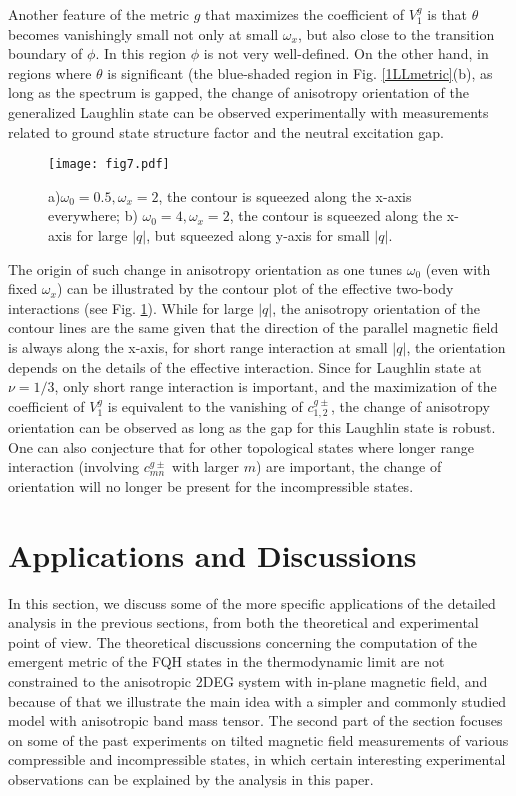 \documentclass[twocolumn,showpacs,amsmath,amstex,amssymb,mathfonts,prb]{revtex4-1}
\begin{document}
Another feature of the metric $g$ that maximizes the coefficient of $V_1^g$ is that $\theta$ becomes vanishingly small not only at small $\omega_x$, but also close to the transition boundary of $\phi$. In this region $\phi$ is not very well-defined. On the other hand, in regions where $\theta$ is significant (the blue-shaded region in Fig. \ref{1LLmetric}(b), as long as the spectrum is gapped, the change of anisotropy orientation of the generalized Laughlin state can be observed experimentally with measurements related to ground state structure factor and the neutral excitation gap\cite{qiu11,zlatko,yang1}.
\begin{figure}[htb]
\texttt{[image: fig7.pdf]}
\caption{a)$\omega_0=0.5,\omega_x=2$, the contour is squeezed along the x-axis everywhere; b) $\omega_0=4,\omega_x=2$, the contour is squeezed along the x-axis for large $|q|$, but squeezed along y-axis for small $|q|$.}
\label{contour_1LL}
\end{figure} 

The origin of such change in anisotropy orientation as one tunes $\omega_0$ (even with fixed $\omega_x$) can be illustrated by the contour plot of the effective two-body interactions (see Fig. \ref{contour_1LL}). While for large $|q|$, the anisotropy orientation of the contour lines are the same given that the direction of the parallel magnetic field is always along the x-axis, for short range interaction at small $|q|$, the orientation depends on the details of the effective interaction. Since for Laughlin state at $\nu=1/3$, only short range interaction is important, and the maximization of the coefficient of $V^g_1$ is equivalent to the vanishing of $c_{1,2}^{g\pm}$, the change of anisotropy orientation can be observed as long as the gap for this Laughlin state is robust. One can also conjecture that for other topological states where longer range interaction (involving $c^{g\pm}_{mn}$ with larger $m$) are important, the change of orientation will no longer be present for the incompressible states.

\section{Applications and Discussions}\label{tlimit}

In this section, we discuss some of the more specific applications of the detailed analysis in the previous sections, from both the theoretical and experimental point of view. The theoretical discussions concerning the computation of the emergent metric of the FQH states in the thermodynamic limit are not constrained to the anisotropic 2DEG system with in-plane magnetic field, and because of that we illustrate the main idea with a simpler and commonly studied model with anisotropic band mass tensor. The second part of the section focuses on some of the past experiments on tilted magnetic field measurements of various compressible and incompressible states, in which certain interesting experimental observations can be explained by the analysis in this paper.
\end{document}
